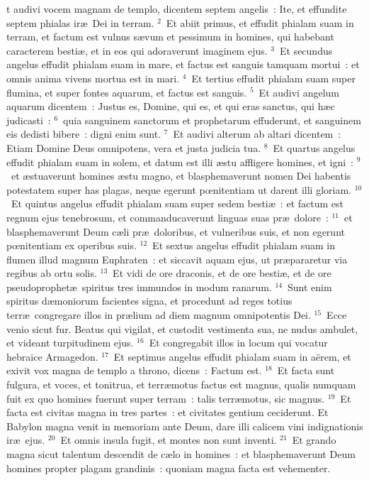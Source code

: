 \bchapter
{}t audivi vocem magnam de templo, dicentem septem angelis~: Ite, et effundite septem phialas ir\ae\ Dei in terram.
${}^{2}$~Et abiit primus, et effudit phialam suam in terram, et factum est vulnus s\ae vum et pessimum in homines, qui habebant caracterem besti\ae , et in eos qui adoraverunt imaginem ejus.
${}^{3}$~Et secundus angelus effudit phialam suam in mare, et factus est sanguis tamquam mortui~: et omnis anima vivens mortua est in mari.
${}^{4}$~Et tertius effudit phialam suam super flumina, et super fontes aquarum, et factus est sanguis.
${}^{5}$~Et audivi angelum aquarum dicentem~: Justus es, Domine, qui es, et qui eras sanctus, qui h\ae c judicasti~:
${}^{6}$~quia sanguinem sanctorum et prophetarum effuderunt, et sanguinem eis dedisti bibere~: digni enim sunt.
${}^{7}$~Et audivi alterum ab altari dicentem~: Etiam Domine Deus omnipotens, vera et justa judicia tua.
${}^{8}$~Et quartus angelus effudit phialam suam in solem, et datum est illi \ae stu affligere homines, et igni~:
${}^{9}$~et \ae stuaverunt homines \ae stu magno, et blasphemaverunt nomen Dei habentis potestatem super has plagas, neque egerunt pœnitentiam ut darent illi gloriam.
${}^{10}$~Et quintus angelus effudit phialam suam super sedem besti\ae~: et factum est regnum ejus tenebrosum, et commanducaverunt linguas suas pr\ae\ dolore~:
${}^{11}$~et blasphemaverunt Deum c\ae li pr\ae\ doloribus, et vulneribus suis, et non egerunt pœnitentiam ex operibus suis.
${}^{12}$~Et sextus angelus effudit phialam suam in flumen illud magnum Euphraten~: et siccavit aquam ejus, ut pr\ae pararetur via regibus ab ortu solis.
${}^{13}$~Et vidi de ore draconis, et de ore besti\ae , et de ore pseudoprophet\ae\ spiritus tres immundos in modum ranarum.
${}^{14}$~Sunt enim spiritus d\ae moniorum facientes signa, et procedunt ad reges totius terr\ae\ congregare illos in pr\ae lium ad diem magnum omnipotentis Dei.
${}^{15}$~Ecce venio sicut fur. Beatus qui vigilat, et custodit vestimenta sua, ne nudus ambulet, et videant turpitudinem ejus.
${}^{16}$~Et congregabit illos in locum qui vocatur hebraice Armagedon.
${}^{17}$~Et septimus angelus effudit phialam suam in a\"erem, et exivit vox magna de templo a throno, dicens~: Factum est.
${}^{18}$~Et facta sunt fulgura, et voces, et tonitrua, et terr\ae motus factus est magnus, qualis numquam fuit ex quo homines fuerunt super terram~: talis terr\ae motus, sic magnus.
${}^{19}$~Et facta est civitas magna in tres partes~: et civitates gentium ceciderunt. Et Babylon magna venit in memoriam ante Deum, dare illi calicem vini indignationis ir\ae\ ejus.
${}^{20}$~Et omnis insula fugit, et montes non sunt inventi.
${}^{21}$~Et grando magna sicut talentum descendit de c\ae lo in homines~: et blasphemaverunt Deum homines propter plagam grandinis~: quoniam magna facta est vehementer.

